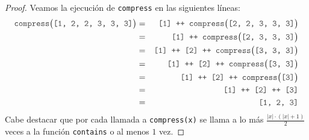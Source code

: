 \documentclass{article}
\newcommand{\code}[1]{\textcolor{white!25!black}{\texttt{#1}}}
\begin{document}
\begin{proof} Veamos la ejecución de \code{compress} en las siguientes líneas:
  \begin{eqnarray*}
    \code{compress}\big(\code{[1, 2, 2, 3, 3, 3]}\big)
    &=& \code{[1] ++ compress}\big(\code{[2, 2, 3, 3, 3]}\big)\\
    &=& \code{[1] ++ compress}\big(\code{[2, 3, 3, 3]}\big)\\
    &=& \code{[1] ++ [2] ++ compress}\big(\code{[3, 3, 3]}\big)\\
    &=& \code{[1] ++ [2] ++ compress}\big(\code{[3, 3]}\big)\\
    &=& \code{[1] ++ [2] ++ compress}\big(\code{[3]}\big)\\
    &=& \code{[1] ++ [2] ++ [3]}\\
    &=& \code{[1, 2, 3]}
  \end{eqnarray*}
  Cabe destacar que por cada llamada a \code{compress(x)} se llama a lo más
  $\frac{|x| \cdot (|x| + 1)}{2}$ veces a la función \code{contains} o al menos $1$ vez.
\end{proof}
\end{document}
